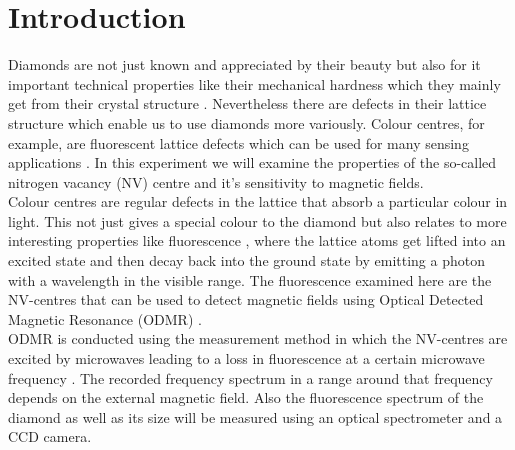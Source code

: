 \section{Introduction}

Diamonds are not just known and appreciated by their beauty but also for it important technical properties like their mechanical hardness which they mainly get from their crystal structure \cite{jelezko_single_2006}. Nevertheless there are defects in their lattice structure which enable us to use diamonds more variously. Colour centres, for example, are fluorescent lattice defects which can be used for many sensing applications \cite{anleitung}. In this experiment we will examine the properties of the so-called nitrogen vacancy (NV) centre and it's sensitivity to magnetic fields.\\

Colour centres are regular defects in the lattice that absorb a particular colour in light. This not just gives a special colour to the diamond but also relates to more interesting properties like fluorescence \cite{lesik_engineering_2015}, where the lattice atoms get lifted into an excited state and then decay back into the ground state by emitting a photon with a wavelength in the visible range. The fluorescence examined here are the NV-centres that can be used to detect magnetic fields using Optical Detected Magnetic Resonance (ODMR) \cite{davis_mapping_2018}.\\

ODMR is conducted using the measurement method in which the NV-centres are excited by microwaves leading to a loss in fluorescence at a certain microwave frequency \cite{schirhagl_nitrogen-vacancy_2014}. The recorded frequency spectrum in a range around that frequency depends on the external magnetic field. Also the fluorescence spectrum of the diamond as well as its size will be measured using an optical spectrometer and a CCD camera.